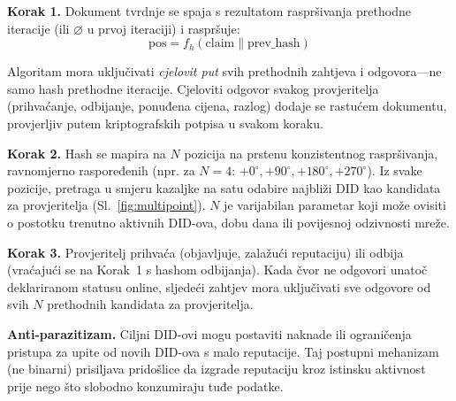 \documentclass[11pt,a4paper,twocolumn]{article}
\begin{document}
\textbf{Korak 1.} Dokument tvrdnje se spaja s rezultatom raspršivanja prethodne iteracije (ili $\varnothing$ u prvoj iteraciji) i raspršuje:
\begin{equation}
\text{pos} = f_h(\text{claim} \| \text{prev\_hash})
\label{eq:hash}
\end{equation}

Algoritam mora uključivati \emph{cjelovit put} svih prethodnih zahtjeva i odgovora---ne samo hash prethodne iteracije. Cjeloviti odgovor svakog provjeritelja (prihvaćanje, odbijanje, ponuđena cijena, razlog) dodaje se rastućem dokumentu, provjerljiv putem kriptografskih potpisa u svakom koraku.

\textbf{Korak 2.} Hash se mapira na $N$ pozicija na prstenu konzistentnog raspršivanja, ravnomjerno raspoređenih (npr. za $N=4$: $+0^{\circ}, +90^{\circ}, +180^{\circ}, +270^{\circ}$). Iz svake pozicije, pretraga u smjeru kazaljke na satu odabire najbliži DID kao kandidata za provjeritelja (Sl.~\ref{fig:multipoint}). $N$ je varijabilan parametar koji može ovisiti o postotku trenutno aktivnih DID-ova, dobu dana ili povijesnoj odzivnosti mreže.

\textbf{Korak 3.} Provjeritelj prihvaća (objavljuje, zalažući reputaciju) ili odbija (vraćajući se na Korak~1 s hashom odbijanja). Kada čvor ne odgovori unatoč deklariranom statusu online, sljedeći zahtjev mora uključivati sve odgovore od svih $N$ prethodnih kandidata za provjeritelja.

\textbf{Anti-parazitizam.} Ciljni DID-ovi mogu postaviti naknade ili ograničenja pristupa za upite od novih DID-ova s malo reputacije. Taj postupni mehanizam (ne binarni) prisiljava pridošlice da izgrade reputaciju kroz istinsku aktivnost prije nego što slobodno konzumiraju tuđe podatke.
\end{document}
